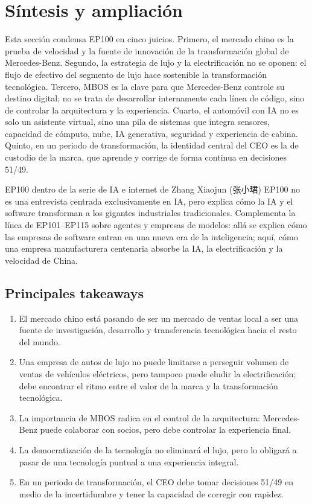 \documentclass[a4paper]{article}
\begin{document}
\section{Síntesis y ampliación}

Esta sección condensa EP100 en cinco juicios. Primero, el mercado chino es la prueba de velocidad y la fuente de innovación de la transformación global de Mercedes-Benz. Segundo, la estrategia de lujo y la electrificación no se oponen: el flujo de efectivo del segmento de lujo hace sostenible la transformación tecnológica. Tercero, MBOS es la clave para que Mercedes-Benz controle su destino digital; no se trata de desarrollar internamente cada línea de código, sino de controlar la arquitectura y la experiencia. Cuarto, el automóvil con IA no es solo un asistente virtual, sino una pila de sistemas que integra sensores, capacidad de cómputo, nube, IA generativa, seguridad y experiencia de cabina. Quinto, en un periodo de transformación, la identidad central del CEO es la de custodio de la marca, que aprende y corrige de forma continua en decisiones 51/49.

\begin{importantbox}{EP100 dentro de la serie de IA e internet de Zhang Xiaojun (张小珺)}
EP100 no es una entrevista centrada exclusivamente en IA, pero explica cómo la IA y el software transforman a los gigantes industriales tradicionales. Complementa la línea de EP101--EP115 sobre agentes y empresas de modelos: allá se explica cómo las empresas de software entran en una nueva era de la inteligencia; aquí, cómo una empresa manufacturera centenaria absorbe la IA, la electrificación y la velocidad de China.
\end{importantbox}

\subsection{Principales takeaways}

\begin{enumerate}
\item El mercado chino está pasando de ser un mercado de ventas local a ser una fuente de investigación, desarrollo y transferencia tecnológica hacia el resto del mundo.
\item Una empresa de autos de lujo no puede limitarse a perseguir volumen de ventas de vehículos eléctricos, pero tampoco puede eludir la electrificación; debe encontrar el ritmo entre el valor de la marca y la transformación tecnológica.
\item La importancia de MBOS radica en el control de la arquitectura: Mercedes-Benz puede colaborar con socios, pero debe controlar la experiencia final.
\item La democratización de la tecnología no eliminará el lujo, pero lo obligará a pasar de una tecnología puntual a una experiencia integral.
\item En un periodo de transformación, el CEO debe tomar decisiones 51/49 en medio de la incertidumbre y tener la capacidad de corregir con rapidez.
\end{enumerate}
\end{document}
